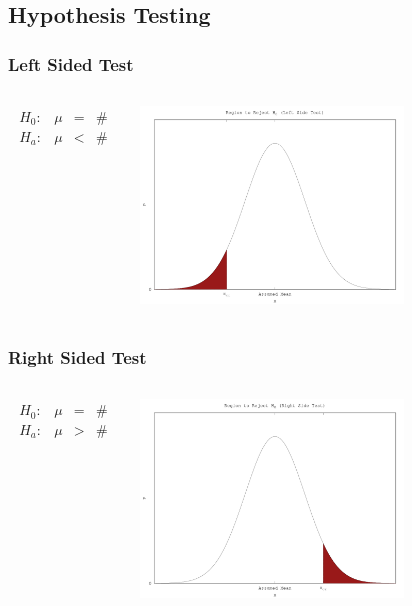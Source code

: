 \subsection{Hypothesis Testing}

\begin{frame}
  \frametitle{Left Sided Test}

  \begin{columns}
    \begin{eqnarray*}
      \begin{array}{lrcl}
        H_0: & \mu & = & \# \\
        H_a: & \mu & < & \#
      \end{array}
    \end{eqnarray*}


    \includegraphics[width=7cm]{img/leftSideHypothesisTest}

  \end{columns}

\end{frame}

\begin{frame}
  \frametitle{Right Sided Test}

  \begin{columns}
    \begin{eqnarray*}
      \begin{array}{lrcl}
        H_0: & \mu & = & \# \\
        H_a: & \mu & > & \#
      \end{array}
    \end{eqnarray*}


    \includegraphics[width=7cm]{img/rightSideHypothesisTest}

  \end{columns}

\end{frame}


